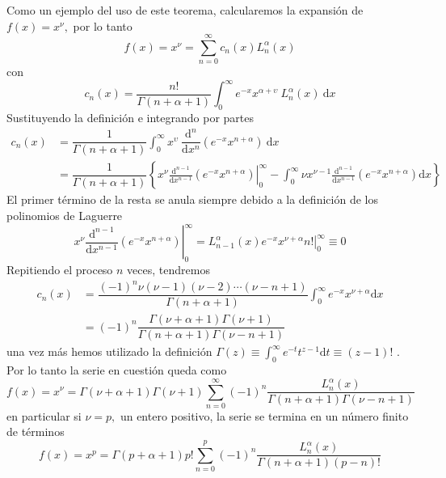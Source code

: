 \documentclass[spanish,notitlepage,letterpaper,12pt]{article}
\begin{document}
Como un ejemplo del uso de este teorema, calcularemos la expansi\'{o}n de
$f(x)=x^{\nu},$ por lo tanto
\[
f(x)=x^{\nu}=\sum_{n=0}^{\infty}c_{n}(x)L_{n}^{\alpha}(x)
\]
con
\[
c_{n}(x)=\dfrac{n!}{\Gamma\left(  n+\alpha+1\right)  }%
{\displaystyle\int_{0}^{\infty}}
e^{-x}x^{\alpha+\upsilon}\ L_{n}^{\alpha}(x)\ \mathrm{d}x
\]
Sustituyendo la definici\'{o}n e integrando por partes
\begin{align*}
c_{n}(x)  & =\dfrac{1}{\Gamma\left(  n+\alpha+1\right)  }%
{\displaystyle\int_{0}^{\infty}}
x^{\upsilon}\ \dfrac{\mathrm{d}^{n}}{\mathrm{d}x^{n}}(e^{-x}x^{n+\alpha
})\ \mathrm{d}x\\
& =\dfrac{1}{\Gamma\left(  n+\alpha+1\right)  }\left\{  \left.  x^{\nu}%
\frac{\mathrm{d}^{n-1}}{\mathrm{d}x^{n-1}}\left(  e^{-x}x^{n+\alpha}\right)
\right|  _{0}^{\infty}-\int_{0}^{\infty}\nu x^{\nu-1}\frac{\mathrm{d}^{n-1}%
}{\mathrm{d}x^{n-1}}\left(  e^{-x}x^{n+\alpha}\right)  \mathrm{d}x\right\}
\end{align*}
El primer t\'{e}rmino de la resta se anula siempre debido a la definici\'{o}n
de los polinomios de Laguerre
\[
\left.  x^{\nu}\frac{\mathrm{d}^{n-1}}{\mathrm{d}x^{n-1}}\left(
e^{-x}x^{n+\alpha}\right)  \right|  _{0}^{\infty}=\left.  L_{n-1}^{\alpha
}(x)e^{-x}x^{\nu+\alpha}n!\right|  _{0}^{\infty}\equiv0
\]
Repitiendo el proceso $n$ veces, tendremos
\begin{align*}
c_{n}(x)  & =\dfrac{(-1)^{n}\nu(\nu-1)(\nu-2)\cdots(\nu-n+1)}{\Gamma\left(
n+\alpha+1\right)  }\int_{0}^{\infty}e^{-x}x^{\nu+\alpha}\mathrm{d}x\\
& =(-1)^{n}\dfrac{\Gamma\left(  \nu+\alpha+1\right)  \Gamma\left(
\nu+1\right)  }{\Gamma\left(  n+\alpha+1\right)  \Gamma\left(  \nu-n+1\right)
}%
\end{align*}
una vez m\'{a}s hemos utilizado la definici\'{o}n $\Gamma\left(  z\right)
\equiv\int_{0}^{\infty}e^{-t}t^{z-1}\mathrm{d}t\equiv\left(  z-1\right)  !$ .
Por lo tanto la serie en cuesti\'{o}n queda como
\[
f(x)=x^{\nu}=\Gamma\left(  \nu+\alpha+1\right)  \Gamma\left(  \nu+1\right)
\sum_{n=0}^{\infty}(-1)^{n}\frac{L_{n}^{\alpha}(x)}{\Gamma\left(
n+\alpha+1\right)  \Gamma\left(  \nu-n+1\right)  }%
\]
en particular si $\nu=p,$ un entero positivo, la serie se termina en un
n\'{u}mero finito de t\'{e}rminos
\[
f(x)=x^{p}=\Gamma\left(  p+\alpha+1\right)  p!\sum_{n=0}^{p}(-1)^{n}%
\frac{L_{n}^{\alpha}(x)}{\Gamma\left(  n+\alpha+1\right)  (p-n)!}%
\]
\end{document}
